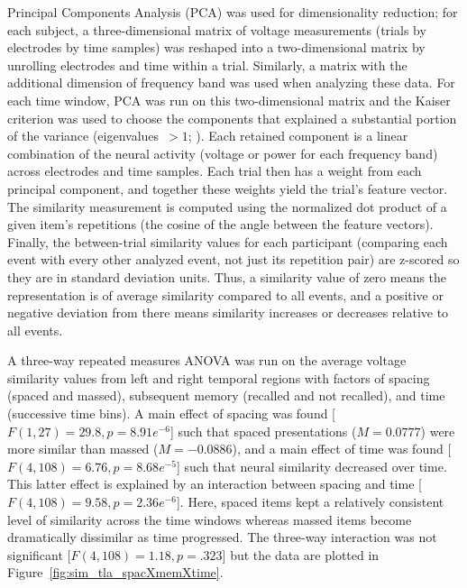 
Principal Components Analysis (PCA) was used for dimensionality reduction; for each subject, a three-dimensional matrix of voltage measurements (trials by electrodes by time samples) was reshaped into a two-dimensional matrix by unrolling electrodes and time within a trial.  Similarly, a matrix with the additional dimension of frequency band was used when analyzing these data.  For each time window, PCA was run on this two-dimensional matrix and the Kaiser criterion was used to choose the components that explained a substantial portion of the variance (eigenvalues~$>1$; ).
Each retained component is a linear combination of the neural activity (voltage or power for each frequency band) across electrodes and time samples.  Each trial then has a weight from each principal component, and together these weights yield the trial's feature vector.  The similarity measurement is computed using the normalized dot product of a given item's repetitions (the cosine of the angle between the feature vectors).  Finally, the between-trial similarity values for each participant (comparing each event with every other analyzed event, not just its repetition pair) are z-scored so they are in standard deviation units.  Thus, a similarity value of zero means the representation is of average similarity compared to all events, and a positive or negative deviation from there means similarity increases or decreases relative to all events.




A three-way repeated measures ANOVA was run on the average voltage similarity values from left and right temporal regions with factors of spacing (spaced and massed), subsequent memory (recalled and not recalled), and time (successive time bins).  A main effect of spacing was found [$F(1,27)=29.8, p=8.91e^{-6}$] such that spaced presentations ($M=0.0777$) were more similar than massed ($M=-0.0886$), and a main effect of time was found [$F(4,108)=6.76, p=8.68e^{-5}$] such that neural similarity decreased over time.
This latter effect is explained by an interaction between spacing and time [$F(4,108)=9.58, p=2.36e^{-6}$].  Here, spaced items kept a relatively consistent level of similarity across the time windows whereas massed items become dramatically dissimilar as time progressed.  The three-way interaction was not significant [$F(4,108)=1.18, p=.323$] but the data are plotted in Figure~\ref{fig:sim_tla_spacXmemXtime}.


